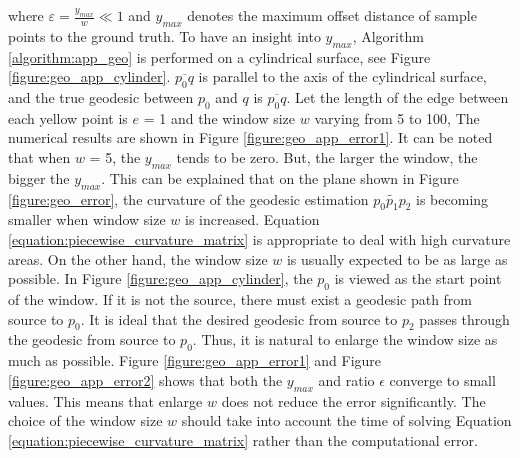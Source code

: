 where $\varepsilon=\frac{y_{max}}{w}\ll1$ and $y_{max}$ denotes the maximum offset distance of sample points to the ground truth. To have an insight into $y_{max}$, Algorithm \ref{algorithm:app_geo} is performed on a cylindrical surface, see Figure \ref{figure:geo_app_cylinder}. $\overline{p_{0}q}$ is parallel to the axis of the cylindrical surface, and the true geodesic between $p_{0}$ and $q$ is $\overline{p_{0}q}$. Let the length of the edge between each yellow point is $e$ = 1 and the window size $w$ varying from 5 to 100,  The numerical results are shown in Figure \ref{figure:geo_app_error1}. It can be noted that when $w$ = 5, the $y_{max}$ tends to be zero. But, the larger the window, the bigger the $y_{max}$. This can be explained that on the plane shown in Figure \ref{figure:geo_error}, the curvature of the geodesic estimation $\widetilde{p_{0}p_{1}p_{2}}$ is becoming smaller when window size $w$ is increased. Equation \ref{equation:piecewise_curvature_matrix} is appropriate to deal with high curvature areas. On the other hand, the window size $w$ is usually expected to be as large as possible. In Figure \ref{figure:geo_app_cylinder}, the $p_{0}$ is viewed as the start point of the window. If it is not the source, there must exist a geodesic path from source to $p_{0}$. It is ideal that the desired geodesic from source to $p_{2}$ passes through the geodesic from source to $p_{0}$. Thus, it is natural to enlarge the window size as much as possible. Figure \ref{figure:geo_app_error1} and Figure \ref{figure:geo_app_error2} shows that both the $y_{max}$ and ratio $\epsilon$ converge to small values. This means that enlarge $w$ does not reduce the error significantly. The choice of the window size $w$ should take into account the time of solving Equation \ref{equation:piecewise_curvature_matrix} rather than the computational error.

